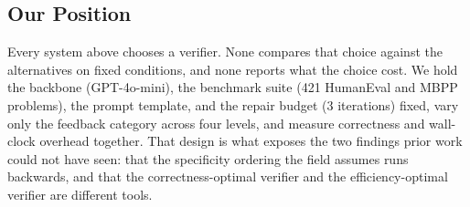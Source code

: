 \subsection{Our Position}

Every system above chooses a verifier. None compares that choice against the alternatives on fixed conditions, and none reports what the choice cost. We hold the backbone (GPT-4o-mini), the benchmark suite (421 HumanEval and MBPP problems), the prompt template, and the repair budget (3 iterations) fixed, vary only the feedback category across four levels, and measure correctness and wall-clock overhead together. That design is what exposes the two findings prior work could not have seen: that the specificity ordering the field assumes runs backwards, and that the correctness-optimal verifier and the efficiency-optimal verifier are different tools.
